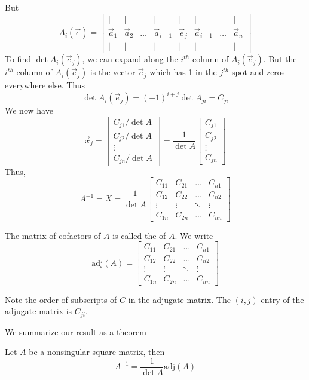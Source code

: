\documentclass{ximera}
\begin{document}
But
$$A_i(\vec{e})=\begin{bmatrix}
           | & |& &|&|&|&&|\\
		\vec{a}_1 & \vec{a}_2&\dots &\vec{a}_{i-1}&\vec{e}_j&\vec{a}_{i+1}&\dots&\vec{a}_n\\
		| & |& &|&|&|&&|
         \end{bmatrix}$$
To find $\det{A_i(\vec{e}_j)}$, we can expand along the $i^{th}$ column of $A_i(\vec{e}_j)$.  But the $i^{th}$ column of $A_i(\vec{e}_j)$ is the vector $\vec{e}_j$ which has 1 in the $j^{th}$ spot and zeros everywhere else.  Thus 
$$\det{A_i(\vec{e}_j)}=(-1)^{i+j}\det{A_{ji}}=C_{ji}$$
We now have
$$\vec{x}_j=\begin{bmatrix}C_{j1}/\det{A}\\C_{j2}/\det{A}\\\vdots\\C_{jn}/\det{A}\end{bmatrix}=\frac{1}{\det{A}}\begin{bmatrix}C_{j1}\\C_{j2}\\\vdots\\C_{jn}\end{bmatrix}$$
Thus,
$$A^{-1}=X=\frac{1}{\det{A}}\begin{bmatrix}C_{11}&C_{21}&\ldots&C_{n1}\\C_{12}&C_{22}&\ldots&C_{n2}\\\vdots&\vdots&\ddots&\vdots\\
C_{1n}&C_{2n}&\ldots&C_{nn}\end{bmatrix}$$

The matrix of cofactors of $A$ is called the  of $A$.  We write
$$\text{adj}(A)=\begin{bmatrix}C_{11}&C_{21}&\ldots&C_{n1}\\C_{12}&C_{22}&\ldots&C_{n2}\\\vdots&\vdots&\ddots&\vdots\\
C_{1n}&C_{2n}&\ldots&C_{nn}\end{bmatrix}$$

\begin{warning}
Note the order of subscripts of $C$ in the adjugate matrix.  The $(i,j)$-entry of the adjugate matrix is $C_{ji}$.
\end{warning}

We summarize our result as a theorem 

\begin{theorem}\label{th:adjugateinverseformula}
Let $A$ be a nonsingular square matrix, then
$$A^{-1}=\frac{1}{\det{A}}\mbox{adj}(A)$$
\end{theorem}
\end{document}
